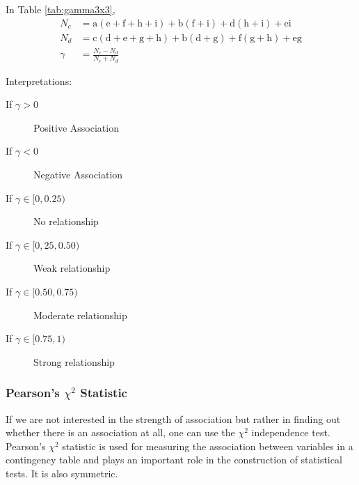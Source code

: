 \documentclass[
10pt, %
a4paper, %
]{report}
\begin{document}
In Table \ref{tab:gamma3x3},
\begin{align*}
N_c &= \mathrm{a}(\mathrm{e}+\mathrm{f}+\mathrm{h}+\mathrm{i}) + \mathrm{b}(\mathrm{f}+\mathrm{i}) + \mathrm{d}(\mathrm{h}+\mathrm{i}) + \mathrm{ei} \\
N_d &= \mathrm{c}(\mathrm{d}+\mathrm{e}+\mathrm{g}+\mathrm{h}) + \mathrm{b}(\mathrm{d}+\mathrm{g}) + \mathrm{f}(\mathrm{g}+\mathrm{h}) + \mathrm{eg} \\
\gamma &= \frac{N_c - N_d}{N_c + N_d}
\end{align*}

Interpretations:
\begin{description}
\item[If \(\gamma > 0\)] \item[] Positive Association
\item[If \(\gamma < 0\)] \item[] Negative Association
\item[If \(\gamma \in [0, 0.25)\)] \item[] No relationship
\item[If \(\gamma \in [0,25, 0.50)\)] \item[] Weak relationship
\item[If \(\gamma \in [0.50, 0.75)\)] \item[] Moderate relationship
\item[If \(\gamma \in [0.75, 1)\)] \item[] Strong relationship
\end{description}

\subsubsection*{Pearson's \(\chi^2\) Statistic}

If we are not interested in the strength of association but rather in finding out whether there is an association at all, one can use the \(\chi^2\) independence test. Pearson’s \(\chi^2\) statistic is used for measuring the association between variables in a contingency table and plays an important role in the construction of statistical tests. It is also symmetric.
\end{document}

